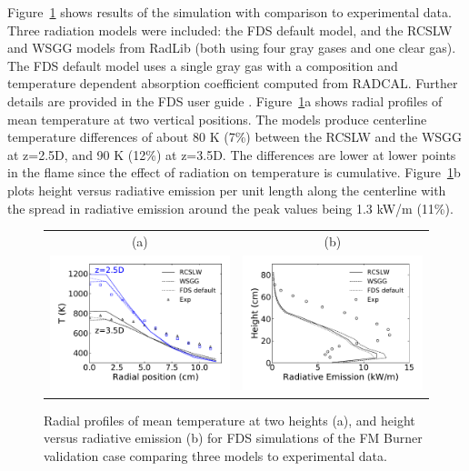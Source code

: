 \documentclass[preprint,12pt]{elsarticle}
\begin{document}
    Figure~\ref{f:fds} shows results of the simulation with comparison to experimental data. Three radiation models were included: the FDS default model, and the RCSLW and WSGG models from RadLib (both using four gray gases and one clear gas).
    The FDS default model uses a single gray gas with a composition and temperature dependent absorption coefficient computed from RADCAL. Further details are provided in the FDS user guide \cite{FDS}.
    Figure~\ref{f:fds}a shows radial profiles of mean temperature at two vertical positions. The models produce centerline temperature differences of about 80 K (7\%) between the RCSLW and the WSGG at z=2.5D, and 90 K (12\%) at z=3.5D. The differences are lower at lower points in the flame since the effect of radiation on temperature is cumulative. Figure~\ref{f:fds}b plots height versus radiative emission per unit length along the centerline with the spread in radiative emission around the peak values being 1.3 kW/m (11\%).
%
    \begin{figure}
        \begin{center}
            \begin{tabular}{c c}
            (a)
                & (b) \\
                \includegraphics[width=2.5 in]{fig_fds_T_mean.pdf} &
                \includegraphics[width=2.5 in]{fig_fds_rad_mean.pdf}
            \end{tabular}
            \caption{Radial profiles of mean temperature at two heights (a), and height versus radiative emission (b) for FDS simulations of the FM Burner validation case comparing three models to experimental data.}
            \label{f:fds}
        \end{center}
    \end{figure}
%
\end{document}
